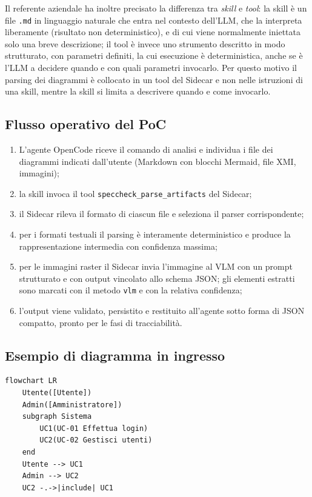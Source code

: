 \documentclass[a4paper, 11pt]{article}
\begin{document}
Il referente aziendale ha inoltre precisato la differenza tra \textit{skill} e \textit{tool}: la skill è un file \texttt{.md} in linguaggio naturale che entra nel contesto dell'LLM, che la interpreta liberamente (risultato non deterministico), e di cui viene normalmente iniettata solo una breve descrizione; il tool è invece uno strumento descritto in modo strutturato, con parametri definiti, la cui esecuzione è deterministica, anche se è l'LLM a decidere quando e con quali parametri invocarlo. Per questo motivo il parsing dei diagrammi è collocato in un tool del Sidecar e non nelle istruzioni di una skill, mentre la skill si limita a descrivere quando e come invocarlo.

\subsection{Flusso operativo del PoC}
\begin{enumerate}
    \item L'agente OpenCode riceve il comando di analisi e individua i file dei diagrammi indicati dall'utente (Markdown con blocchi Mermaid, file XMI, immagini);
    \item la skill invoca il tool \texttt{speccheck\_parse\_artifacts} del Sidecar;
    \item il Sidecar rileva il formato di ciascun file e seleziona il parser corrispondente;
    \item per i formati testuali il parsing è interamente deterministico e produce la rappresentazione intermedia con confidenza massima;
    \item per le immagini raster il Sidecar invia l'immagine al VLM con un prompt strutturato e con output vincolato allo schema JSON; gli elementi estratti sono marcati con il metodo \texttt{vlm} e con la relativa confidenza;
    \item l'output viene validato, persistito e restituito all'agente sotto forma di JSON compatto, pronto per le fasi di tracciabilità.
\end{enumerate}

\subsection{Esempio di diagramma in ingresso}
\begin{lstlisting}[caption={Esempio di caso d'uso espresso in Mermaid tramite convenzioni su flowchart.}]
flowchart LR
    Utente([Utente])
    Admin([Amministratore])
    subgraph Sistema
        UC1(UC-01 Effettua login)
        UC2(UC-02 Gestisci utenti)
    end
    Utente --> UC1
    Admin --> UC2
    UC2 -.->|include| UC1
\end{lstlisting}
\end{document}
